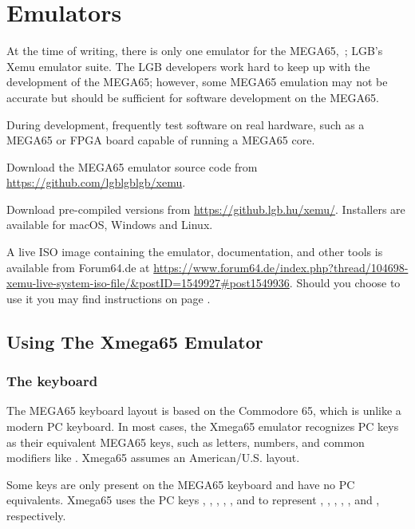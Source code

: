 \chapter{Emulators}

At the time of writing, there is only one emulator for the MEGA65,\ ; LGB's Xemu emulator suite. The LGB developers work hard to keep up with the development of the MEGA65; however, some MEGA65 emulation may not be accurate but should be sufficient for software development on the MEGA65.


During development, frequently test software on real hardware, such as a MEGA65 or FPGA board capable of running a MEGA65 core.

Download the MEGA65 emulator source code from \url{https://github.com/lgblgblgb/xemu}.

Download pre-compiled versions from \url{https://github.lgb.hu/xemu/}. Installers are
available for macOS, Windows and Linux.

A live ISO image containing the emulator, documentation, and other tools is available from
Forum64.de
at \url{https://www.forum64.de/index.php?thread/104698-xemu-live-system-iso-file/\&postID=1549927\#post1549936}.
Should you choose to use it you may find instructions on page \pageref{sec:live-iso-image}.

\section{Using The Xmega65 Emulator}

\subsection{The keyboard}
\label{sec:xemu-keyboard}

The MEGA65 keyboard layout is based on the Commodore 65, which is unlike a modern PC
keyboard. In most cases, the Xmega65 emulator recognizes PC keys as their equivalent
MEGA65 keys, such as letters, numbers, and common modifiers like .
Xmega65 assumes an American/U.S. layout.

Some keys are only present on the MEGA65 keyboard and have no PC equivalents. Xmega65
uses the PC keys , , ,
, , and  to represent
\megakey{+}, \megakey{\pounds}, , ,
, and , respectively.

